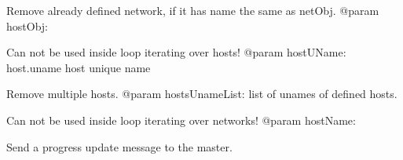 \documentclass[a4paper,11pt,openany]{sphinxmanual}
\begin{document}
\begin{fulllineitems}
\begin{fulllineitems}
\end{fulllineitems}


\begin{fulllineitems}
\label{ref-manual/XrdTest:XrdTest.ClusterManager.ClusterManager.removeDanglingNetwork}
Remove already defined network, if it has name the same as netObj.
@param hostObj:

\end{fulllineitems}


\begin{fulllineitems}
\label{ref-manual/XrdTest:XrdTest.ClusterManager.ClusterManager.removeHost}
Can not be used inside loop iterating over hosts!
@param hostUName: host.uname host unique name

\end{fulllineitems}


\begin{fulllineitems}
\label{ref-manual/XrdTest:XrdTest.ClusterManager.ClusterManager.removeHosts}
Remove multiple hosts.
@param hostsUnameList: list of unames of defined hosts.

\end{fulllineitems}


\begin{fulllineitems}
\label{ref-manual/XrdTest:XrdTest.ClusterManager.ClusterManager.removeNetwork}
Can not be used inside loop iterating over networks!
@param hostName:

\end{fulllineitems}


\begin{fulllineitems}
\label{ref-manual/XrdTest:XrdTest.ClusterManager.ClusterManager.updateState}
Send a progress update message to the master.


\end{fulllineitems}
\end{fulllineitems}
\end{document}
